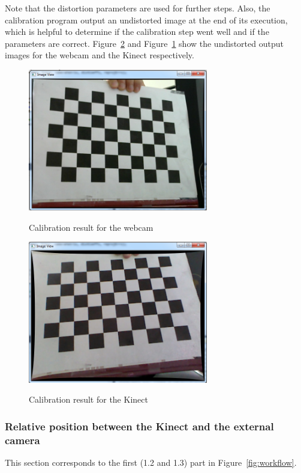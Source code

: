 Note that the distortion parameters are used for further steps. Also, the calibration program output an undistorted image at the end of its execution, which is helpful to determine if the calibration step went well and if the parameters are correct. Figure~\ref{fig:calibration result for the kinect} and Figure~\ref{fig:calibration result for the webcam} show the undistorted output images for the webcam and the Kinect respectively.        

\begin{figure}
\caption{Calibration result for the webcam}
\centering
    \includegraphics[width=0.7\textwidth]{images/resultCalibWebcam.png}
\label{fig:calibration result for the webcam}
\end{figure}

\begin{figure}
\caption{Calibration result for the Kinect}
\centering
    \includegraphics[width=0.7\textwidth]{images/resultCalibKinect.png}
\label{fig:calibration result for the kinect}
\end{figure}

\subsubsection{Relative position between the Kinect and the external camera}
\label{sec:Relative position between the Kinect and the external camera}
This section corresponds to the first (1.2 and 1.3) part in Figure~\ref{fig:workflow}.\\

